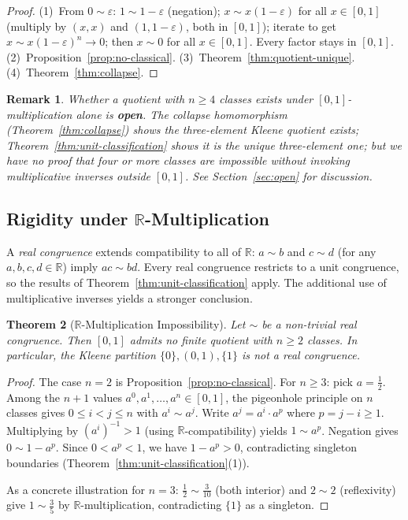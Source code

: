 \documentclass[11pt,a4paper]{article}
\newtheorem{theorem}{Theorem}[section]
\newtheorem{remark}[theorem]{Remark}
\begin{document}
\begin{proof}
(1)~From $0 \sim \varepsilon$:
$1 \sim 1 - \varepsilon$ (negation);
$x \sim x(1 - \varepsilon)$ for all $x \in [0,1]$ (multiply by
$(x, x)$ and $(1, 1 - \varepsilon)$, both in $[0,1]$);
iterate to get $x \sim x(1 - \varepsilon)^n \to 0$; then $x \sim 0$
for all $x \in [0,1]$.
Every factor stays in $[0,1]$.
(2)~Proposition~\ref{prop:no-classical}.
(3)~Theorem~\ref{thm:quotient-unique}.
(4)~Theorem~\ref{thm:collapse}.
\end{proof}

\begin{remark}
Whether a quotient with $n \geq 4$ classes exists under
$[0,1]$-multiplication alone is \textbf{open}.
The collapse homomorphism (Theorem~\ref{thm:collapse}) shows the
three-element Kleene quotient exists;
Theorem~\ref{thm:unit-classification} shows it is the unique
three-element one; but we have no proof that four or more classes
are impossible without invoking multiplicative inverses outside $[0,1]$.
See Section~\ref{sec:open} for discussion.
\end{remark}

\subsection{Rigidity under $\mathbb{R}$-Multiplication}
\label{sec:real-rigidity}

A \emph{real congruence} extends compatibility to all of
$\mathbb{R}$: $a \sim b$ and $c \sim d$ (for any $a,b,c,d \in \mathbb{R}$)
imply $ac \sim bd$.
Every real congruence restricts to a unit congruence, so the
results of Theorem~\ref{thm:unit-classification} apply.
The additional use of multiplicative inverses yields a stronger
conclusion.

\begin{theorem}[$\mathbb{R}$-Multiplication Impossibility]
\label{thm:real-impossibility}
Let $\sim$ be a non-trivial real congruence.
Then $[0,1]$ admits no finite quotient with $n \geq 2$ classes.
In particular, the Kleene partition $\{0\},(0,1),\{1\}$ is \emph{not}
a real congruence.
\end{theorem}

\begin{proof}
The case $n = 2$ is Proposition~\ref{prop:no-classical}.
For $n \geq 3$:
pick $a = \tfrac{1}{2}$.
Among the $n + 1$ values $a^0, a^1, \ldots, a^n \in [0,1]$, the
pigeonhole principle on $n$ classes gives $0 \leq i < j \leq n$ with
$a^i \sim a^j$.
Write $a^j = a^i \cdot a^p$ where $p = j - i \geq 1$.
Multiplying by $(a^i)^{-1} > 1$ (using $\mathbb{R}$-compatibility)
yields $1 \sim a^p$.
Negation gives $0 \sim 1 - a^p$.
Since $0 < a^p < 1$, we have $1 - a^p > 0$, contradicting
singleton boundaries (Theorem~\ref{thm:unit-classification}(1)).

As a concrete illustration for $n = 3$:
$\tfrac{1}{2} \sim \tfrac{3}{10}$ (both interior) and $2 \sim 2$
(reflexivity) give $1 \sim \tfrac{3}{5}$ by
$\mathbb{R}$-multiplication, contradicting $\{1\}$ as a singleton.
\end{proof}
\end{document}
